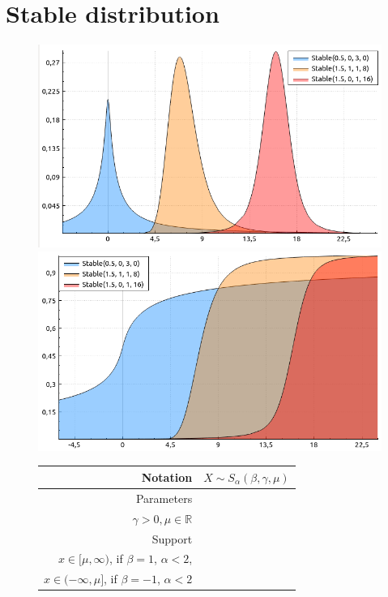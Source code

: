 \documentclass[a4paper,11pt]{article}
\theoremstyle{plain}
\theoremstyle{definition}
\newcommand{\MR}{\mathbb{R}}
\begin{document}
	\section{Stable distribution}
	\begin{figure}[!htb]\centering
		\begin{minipage}{0.55\textwidth}
			\includegraphics[width=\linewidth, right]{stable_pdf}
			\captionsetup{labelformat=empty}
			\includegraphics[width=\linewidth, right]{stable_cdf}
			\captionsetup{labelformat=empty}
		\end{minipage}
		\begin{minipage}{0.4\textwidth}
		\begin{tabular}{| r | l |}
			\hline
			Notation & $X \sim S_\alpha(\beta, \gamma, \mu)$ \\
			\hline
			Parameters & \pbox{\linewidth}{$\alpha \in (0, 2], \beta \in [-1, 1],$\\ $\gamma > 0, \mu \in \MR $} \\
			\hline
			Support & \pbox{\linewidth}{$ x \in \MR$, if  $\beta \neq 1$, \\  $ x \in [\mu, \infty)  $, if  $\beta = 1$, $\alpha < 2$, \\ $ x \in (-\infty, \mu]  $, if  $\beta = -1$, $\alpha < 2$}  \\

\end{tabular}
\end{minipage}
\end{figure}
\end{document}

